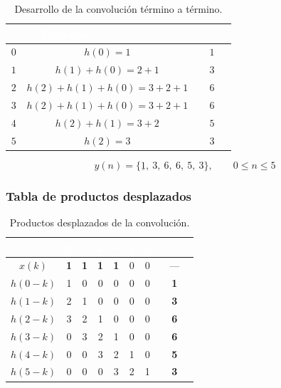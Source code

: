 \documentclass[../Main_Include.tex]{subfiles}
\begin{document}
\begin{table}[H]
\centering
\renewcommand{\arraystretch}{1.4}
\begin{tabular}{ccc}
\toprule
\rowcolor{azulprinc}
\textcolor{white}{\textbf{$n$}} &
\textcolor{white}{\textbf{Productos $x(k)\,h(n-k)$}} &
\textcolor{white}{\textbf{$y(n)$}} \\
\midrule
\rowcolor{grisclaro}
$0$ & $h(0) = 1$ & $1$ \\
$1$ & $h(1)+h(0) = 2+1$ & $3$ \\
\rowcolor{grisclaro}
$2$ & $h(2)+h(1)+h(0) = 3+2+1$ & $6$ \\
$3$ & $h(2)+h(1)+h(0) = 3+2+1$ & $6$ \\
\rowcolor{grisclaro}
$4$ & $h(2)+h(1) = 3+2$ & $5$ \\
$5$ & $h(2) = 3$ & $3$ \\
\bottomrule
\end{tabular}
\caption{Desarrollo de la convolución término a término.}
\end{table}

\[
    \boxed{y(n) = \{\underline{1},\ 3,\ 6,\ 6,\ 5,\ 3\},
    \qquad 0 \le n \le 5}
\]

\subsubsection*{Tabla de productos desplazados}

\begin{table}[H]
\centering
\renewcommand{\arraystretch}{1.4}
\begin{tabular}{cccccccc}
\toprule
\rowcolor{azulprinc}
\textcolor{white}{\textbf{$k$}} &
\textcolor{white}{\textbf{0}} &
\textcolor{white}{\textbf{1}} &
\textcolor{white}{\textbf{2}} &
\textcolor{white}{\textbf{3}} &
\textcolor{white}{\textbf{4}} &
\textcolor{white}{\textbf{5}} &
\textcolor{white}{\textbf{$y(n)$}} \\
\midrule
\rowcolor{grisclaro}
$x(k)$    & \textbf{1} & \textbf{1} & \textbf{1} & \textbf{1} & 0 & 0 & --- \\
$h(0-k)$  & 1 & 0 & 0 & 0 & 0 & 0 & \textbf{1} \\
\rowcolor{grisclaro}
$h(1-k)$  & 2 & 1 & 0 & 0 & 0 & 0 & \textbf{3} \\
$h(2-k)$  & 3 & 2 & 1 & 0 & 0 & 0 & \textbf{6} \\
\rowcolor{grisclaro}
$h(3-k)$  & 0 & 3 & 2 & 1 & 0 & 0 & \textbf{6} \\
$h(4-k)$  & 0 & 0 & 3 & 2 & 1 & 0 & \textbf{5} \\
\rowcolor{grisclaro}
$h(5-k)$  & 0 & 0 & 0 & 3 & 2 & 1 & \textbf{3} \\
\bottomrule
\end{tabular}
\caption{Productos desplazados de la convolución.}
\end{table}
\end{document}
